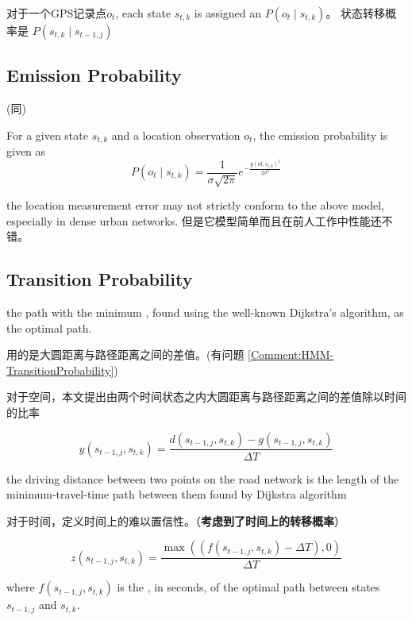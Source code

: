 对于一个GPS记录点$ o_{t} $, each state $ s_{t, k} $ is assigned an  $ P\left(o_{t} \mid s_{t, k}\right) $。 状态转移概率是 $ P\left(s_{t, k} \mid s_{t-1, j}\right) $

\subsection{Emission Probability}

(同\cite{newson2009hidden})

For a given state $ s_{t, k} $ and a location observation $ o_{t} $, the emission probability is given as
$$
P\left(o_{t} \mid s_{t, k}\right)=\frac{1}{\sigma \sqrt{2 \pi}} e^{-\frac{g\left(o t, s_{t, k}\right)^{2}}{2 \sigma^{2}}}
$$

\begin{remark}
    the location measurement error may not strictly conform to the above model, especially in dense urban networks. 但是它模型简单而且在前人工作中性能还不错。
\end{remark}

\subsection{Transition Probability}

the path with the minimum , found using
the well-known Dijkstra’s algorithm, as the optimal path.

\cite{newson2009hidden}用的是大圆距离与路径距离之间的差值。(有问题 \ref{Comment:HMM-TransitionProbability})

对于空间，本文提出由两个时间状态之内大圆距离与路径距离之间的差值除以时间的比率

$$ y\left(s_{t-1, j}, s_{t, k}\right)=\frac{d\left(s_{t-1, j}, s_{t, k}\right)-g\left(s_{t-1, j}, s_{t, k}\right)}{\Delta T} $$

the driving distance
between two points on the road network is the length of the
minimum-travel-time path between them found by Dijkstra
algorithm

对于时间，定义时间上的难以置信性。（\textbf{考虑到了时间上的转移概率}）

$$
z\left(s_{t-1, j}, s_{t, k}\right)=\frac{\max \left(\left(f\left(s_{t-1, j}, s_{t, k}\right)-\Delta T\right), 0\right)}{\Delta T}
$$

where $ f\left(s_{t-1, j}, s_{t, k}\right) $ is the , in seconds, of the optimal path between states $ s_{t-1, j} $ and $ s_{t, k} $.


